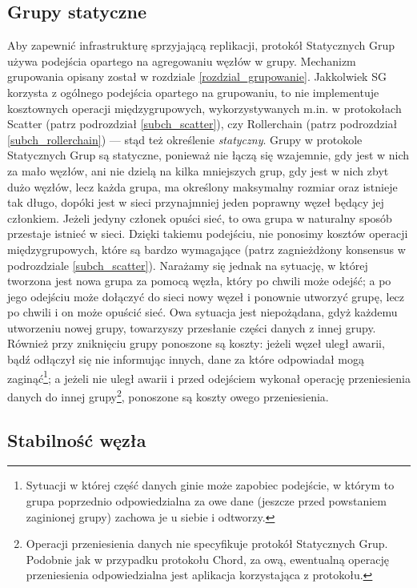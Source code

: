 \documentclass[12pt, twoside, openany]{report}
\begin{document}
\subsection{Grupy statyczne}
Aby zapewnić infrastrukturę sprzyjającą replikacji, protokół Statycznych Grup używa podejścia opartego na agregowaniu węzłów w grupy. Mechanizm grupowania opisany został w rozdziale \ref{rozdzial_grupowanie}. Jakkolwiek SG korzysta z ogólnego podejścia opartego na grupowaniu, to nie implementuje kosztownych operacji międzygrupowych, wykorzystywanych m.in. w protokołach Scatter (patrz podrozdział \ref{subch_scatter}), czy Rollerchain (patrz podrozdział \ref{subch_rollerchain}) --- stąd też określenie \textit{statyczny}. Grupy w protokole Statycznych Grup są statyczne, ponieważ nie łączą się wzajemnie, gdy jest w nich za mało węzłów, ani nie dzielą na kilka mniejszych grup, gdy jest w nich zbyt dużo węzłów, lecz każda grupa, ma określony maksymalny rozmiar oraz istnieje tak długo, dopóki jest w sieci przynajmniej jeden poprawny węzeł będący jej członkiem. Jeżeli jedyny członek opuści sieć, to owa grupa w naturalny sposób przestaje istnieć w sieci. Dzięki takiemu podejściu, nie ponosimy kosztów operacji międzygrupowych, które są bardzo wymagające (patrz zagnieżdżony konsensus w podrozdziale \ref{subch_scatter}). Narażamy się jednak na sytuację, w której tworzona jest nowa grupa za pomocą węzła, który po chwili może odejść; a po jego odejściu może dołączyć do sieci nowy węzeł i ponownie utworzyć grupę, lecz po chwili i on może opuścić sieć. Owa sytuacja jest niepożądana, gdyż każdemu utworzeniu nowej grupy, towarzyszy przesłanie części danych z innej grupy. Również przy zniknięciu grupy ponoszone są koszty: jeżeli węzeł uległ awarii, bądź odłączył się nie informując innych, dane za które odpowiadał mogą zaginąć\footnote{Sytuacji w której część danych ginie może zapobiec podejście, w którym to grupa poprzednio odpowiedzialna za owe dane (jeszcze przed powstaniem zaginionej grupy) zachowa je u siebie i odtworzy.}; a jeżeli nie uległ awarii i przed odejściem wykonał operację przeniesienia danych do innej grupy\footnote{Operacji przeniesienia danych nie specyfikuje protokół Statycznych Grup. Podobnie jak w przypadku protokołu Chord, za ową, ewentualną operację przeniesienia odpowiedzialna jest aplikacja korzystająca z protokołu.}, ponoszone są koszty owego przeniesienia.

\subsection{Stabilność węzła}
\label{stabilnosc_wezla}
\end{document}

